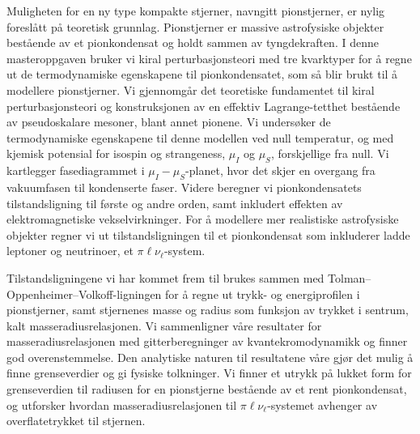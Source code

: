 \vspace*{1.5cm}
Muligheten for en ny type kompakte stjerner, navngitt pionstjerner, er nylig foreslått på teoretisk grunnlag.
Pionstjerner er massive astrofysiske objekter bestående av et pionkondensat og holdt sammen av tyngdekraften.
I denne masteroppgaven bruker vi kiral perturbasjonsteori med tre kvarktyper for å regne ut de termodynamiske egenskapene til pionkondensatet, som så blir brukt til å modellere pionstjerner.
Vi gjennomgår det teoretiske fundamentet til kiral perturbasjonsteori og konstruksjonen av en effektiv Lagrange-tetthet bestående av pseudoskalare mesoner, blant annet pionene.
Vi undersøker de termodynamiske egenskapene til denne modellen ved null temperatur, og med kjemisk potensial for isospin og strangeness, $\mu_I$ og $\mu_S$, forskjellige fra null.
Vi kartlegger fasediagrammet i $\mu_I-\mu_S$-planet, hvor det skjer en overgang fra vakuumfasen til kondenserte faser.
Videre beregner vi pionkondensatets tilstandsligning til første og andre orden, samt inkludert effekten av elektromagnetiske vekselvirkninger.
For å modellere mer realistiske astrofysiske objekter regner vi ut tilstandsligningen til et pionkondensat som inkluderer ladde leptoner og neutrinoer, et $\pi\ell\nu_\ell$-system.

Tilstandsligningene vi har kommet frem til brukes sammen med Tolman--Oppenheimer--Volkoff-ligningen for å regne ut trykk- og energiprofilen i pionstjerner, samt stjernenes masse og radius som funksjon av trykket i sentrum, kalt masseradiusrelasjonen.
Vi sammenligner våre resultater for masseradiusrelasjonen med gitterberegninger av kvantekromodynamikk og finner god overenstemmelse.
Den analytiske naturen til resultatene våre gjør det mulig å finne grenseverdier og gi fysiske tolkninger.
Vi finner et utrykk på lukket form for grenseverdien til radiusen for en pionstjerne bestående av et rent pionkondensat, og utforsker hvordan masseradiusrelasjonen til $\pi\ell\nu_\ell$-systemet avhenger av overflatetrykket til stjernen.
